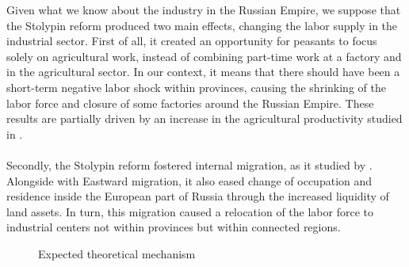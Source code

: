 \documentclass[a4paper, 12pt]{article}
\begin{document}
    \noindent Given what we know about the industry in the Russian Empire, we suppose that the Stolypin reform produced two main effects, changing the labor supply in the industrial sector. First of all, it created an opportunity for peasants to focus solely on agricultural work, instead of combining part-time work at a factory and in the agricultural sector. In our context, it means that there should have been a short-term negative labor shock within provinces, causing the shrinking of the labor force and closure of some factories around the Russian Empire.  These results are partially driven by an increase in the agricultural productivity studied in \cite{castaneda2019stolypin}.
    \\\\
    Secondly, the Stolypin reform fostered internal migration, as it studied by \cite{chernina2014property}. Alongside with Eastward migration, it also eased change of occupation and residence inside the European part of Russia  through the increased liquidity of land assets. In turn, this migration caused a relocation of the labor force to industrial centers not within provinces but within connected regions. 
\\
        
    
\begin{figure}[!htbp]
        \centering
        \caption{Expected theoretical mechanism}
        \label{fig:scheme}
    \end{figure}

\end{document}
